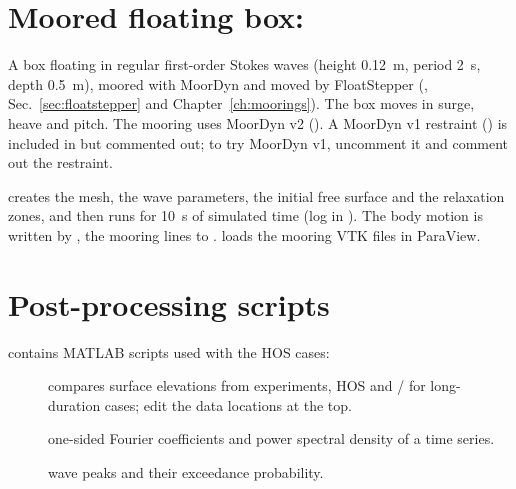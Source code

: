 \section{Moored floating box: \texorpdfstring{}{floatStepperWaveIsoFoam}}
A box floating in regular first-order Stokes waves (height 0.12~m, period 2~s, depth 0.5~m),
moored with MoorDyn and moved by FloatStepper (,
Sec.~\ref{sec:floatstepper} and Chapter~\ref{ch:moorings}). The box moves in surge, heave and
pitch. The mooring uses MoorDyn v2 (). A MoorDyn v1
restraint () is included in  but commented
out; to try MoorDyn v1, uncomment it and comment out the  restraint.

 creates the mesh, the wave parameters, the initial free surface and the relaxation
zones, and then runs  for 10~s of simulated time (log in
). The body motion is written by , the mooring lines to .
 loads the mooring VTK files in ParaView.

\section{Post-processing scripts}
 contains MATLAB scripts used with the HOS cases:
\begin{description}
  \item[] compares surface elevations from experiments, HOS and
    / for long-duration cases; edit the data locations at the top.
  \item[] one-sided Fourier coefficients and power spectral density of a
    time series.
  \item[] wave peaks and their exceedance probability.
\end{description}
